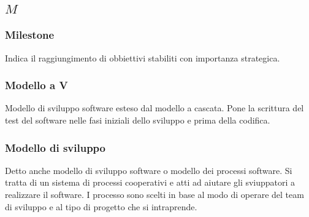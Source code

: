 \subsection*{\quad$M\quad$}

\subsubsection*{Milestone}
Indica il raggiungimento di obbiettivi stabiliti con importanza strategica. 

\subsubsection*{Modello a V}
Modello di sviluppo software esteso dal modello a cascata. Pone la scrittura del test del software nelle fasi iniziali dello sviluppo e prima della codifica.

\subsubsection*{Modello di sviluppo}
Detto anche modello di sviluppo software o modello dei processi software. Si tratta di un sistema di processi cooperativi e atti ad aiutare gli sviuppatori a realizzare il software. I processo sono scelti in base al modo di operare del team di sviluppo e al tipo di progetto che si intraprende.

